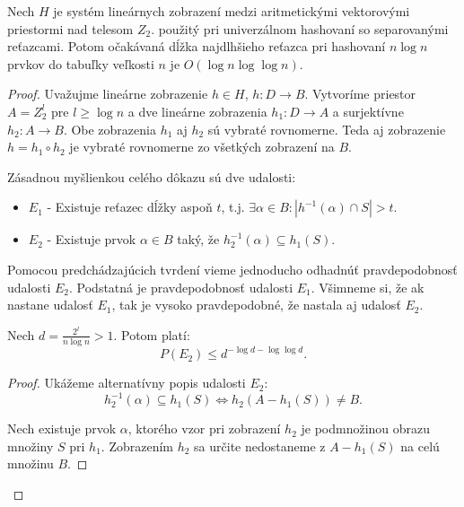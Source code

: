 \begin{theorem}
\label{theorem-n-logn-to-n}
Nech $H$ je systém lineárnych zobrazení medzi aritmetickými vektorovými priestormi nad telesom $Z_2$. použitý pri univerzálnom hashovaní so separovanými reťazcami. Potom očakávaná dĺžka najdlhšieho reťazca pri hashovaní $n \log n$ prvkov do tabuľky veľkosti $n$ je $O(\log n \log \log n)$.
\end{theorem}
\begin{proof}
Uvažujme lineárne zobrazenie $h \in H$, $h: D \rightarrow B$. Vytvoríme priestor $A = Z_2^l$ pre $l \geq \log n$ a dve lineárne zobrazenia $h_1: D \rightarrow A$ a surjektívne $h_2: A \rightarrow B$. Obe zobrazenia $h_1$ aj $h_2$ sú vybraté rovnomerne. Teda aj zobrazenie $h = h_1 \circ h_2$ je vybraté rovnomerne zo všetkých zobrazení na $B$.

Zásadnou myšlienkou celého dôkazu sú dve udalosti:
\begin{itemize}
\item $E_1$ - Existuje reťazec dĺžky aspoň $t$, t.j. $\exists \alpha \in B: | h^{-1}(\alpha) \cap S | > t$.
\item $E_2$ - Existuje prvok $\alpha \in B$ taký, že $h_2^{-1}(\alpha) \subseteq h_1(S)$.
\end{itemize}
Pomocou predchádzajúcich tvrdení vieme jednoducho odhadnúť pravdepodobnosť udalosti $E_2$. Podstatná je pravdepodobnosť udalosti $E_1$. Všimneme si, že ak nastane udalosť $E_1$, tak je vysoko pravdepodobné, že nastala aj udalosť $E_2$.

\begin{remark}
\label{remark-e2-probability}
Nech $d = \frac{2^l}{n \log n} > 1$. Potom platí:
\begin{displaymath}
P(E_2) \leq d^{-\log d - \log \log d}\textit{.}
\end{displaymath}
\end{remark}
\begin{proof}
Ukážeme alternatívny popis udalosti $E_2$:
\begin{displaymath}
h_2^{-1}(\alpha) \subseteq h_1(S) \Leftrightarrow h_2(A - h_1(S)) \neq B \textit{.}
\end{displaymath}

Nech existuje prvok $\alpha$, ktorého vzor pri zobrazení $h_2$ je podmnožinou obrazu množiny $S$ pri $h_1$. Zobrazením $h_2$ sa určite nedostaneme z $A - h_1(S)$ na celú množinu $B$.


\end{proof}
\end{proof}
